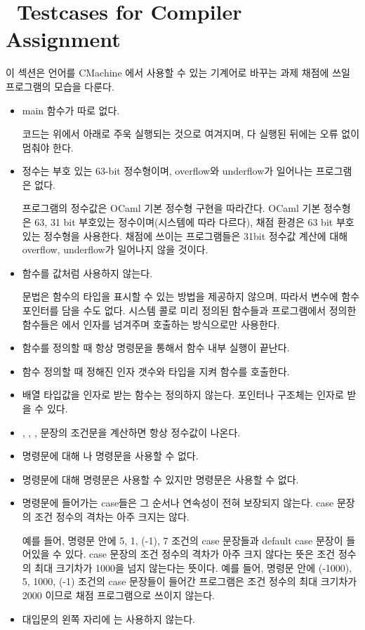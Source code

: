 \section {\SubC \ Testcases for Compiler Assignment}

이 섹션은 \SubC 언어를 CMachine 에서 사용할 수 있는 기계어로 바꾸는 과제 채점에 쓰일 \SubC 프로그램의 모습을 다룬다.

\begin{itemize}
  \item main 함수가 따로 없다.

  코드는 위에서 아래로 주욱 실행되는 것으로 여겨지며, 다 실행된 뒤에는 오류 없이 멈춰야 한다.
  
  \item 정수는 부호 있는 63-bit 정수형이며, overflow와 underflow가 일어나는 프로그램은 없다.
  
  \SubC 프로그램의 정수값은 OCaml 기본 정수형 구현을 따라간다.
  OCaml 기본 정수형은 63, 31 bit 부호있는 정수이며(시스템에 따라 다르다), 채점 환경은 63 bit 부호 있는 정수형을 사용한다.
  채점에 쓰이는 프로그램들은 31bit 정수값 계산에 대해 overflow, underflow가 일어나지 않을 것이다.

  \item 함수를 값처럼 사용하지 않는다.
  
  \SubC 문법은 함수의 타입을 표시할 수 있는 방법을 제공하지 않으며, 따라서 변수에 함수 포인터를 담을 수도 없다.
  시스템 콜로 미리 정의된 함수들과 프로그램에서 정의한 함수들은 \Expression 에서 인자를 넘겨주며 호출하는 방식으로만 사용한다.

  \item 함수를 정의할 때 항상  명령문을 통해서 함수 내부 실행이 끝난다.
  \item 함수 정의할 때 정해진 인자 갯수와 타입을 지켜 함수를 호출한다.
  \item 배열 타입값을 인자로 받는 함수는 정의하지 않는다. 포인터나 구조체는 인자로 받을 수 있다.
  \item \CCif , \CCfor , \CCwhile , \CCswitch 문장의 조건문을 계산하면 항상 정수값이 나온다.
  \item \CCif 명령문에 대해 \CCbreak 나 \CCcontinue 명령문을 사용할 수 없다.
  \item \CCswitch 명령문에 대해 \CCbreak 명령문은 사용할 수 있지만 \CCcontinue 명령문은 사용할 수 없다.
  \item \CCswitch 명령문에 들어가는 case들은 그 순서나 연속성이 전혀 보장되지 않는다. case 문장의 조건 정수의 격차는 아주 크지는 않다.
  
  예를 들어, \CCswitch 명령문 안에 5, 1, (-1), 7 조건의 case 문장들과 default case 문장이 들어있을 수 있다.
  case 문장의 조건 정수의 격차가 아주 크지 않다는 뜻은 조건 정수의 최대 크기차가 1000을 넘지 않는다는 뜻이다.
  예를 들어, \CCswitch 명령문 안에 (-1000), 5, 1000, (-1) 조건의 case 문장들이 들어간 프로그램은 
  조건 정수의 최대 크기차가 2000 이므로 채점 프로그램으로 쓰이지 않는다.

  \item 대입문의 왼쪽 자리에 \CCrparen \CCampersand \LeftValueExpression \CClparen 는 사용하지 않는다.

\end{itemize}
